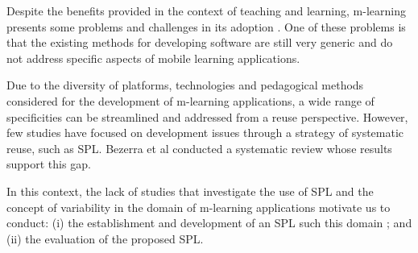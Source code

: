 

Despite the benefits provided in the context of teaching and learning, m-learning presents some problems and challenges in its adoption \cite{sharples13}. One of these problems is that the existing methods for developing software are still very generic and do not address specific aspects of mobile learning applications. 

Due to the diversity of platforms, technologies and pedagogical methods considered for the development of m-learning applications, a wide range of specificities can be streamlined and addressed from a reuse perspective. However, few studies have focused on development issues through a strategy of systematic reuse, such as SPL. Bezerra et al \cite{bezerra09} conducted a systematic review whose results support this gap.


In this context, the lack of studies that investigate the use of SPL and the concept of variability in the domain of m-learning applications motivate us to conduct: (i) the establishment and development of an SPL such this domain \cite{falvojr14,falvojr14b}; and (ii) the evaluation of the proposed SPL.

